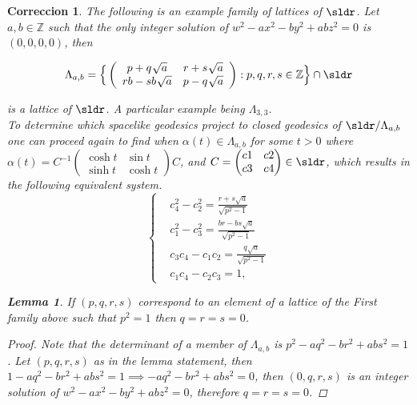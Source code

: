 \documentclass[11pt]{amsart}
\newtheorem{correccion}{Correccion}
\theoremstyle{plain}
\newtheorem{lem}[thm]{Lemma}
\theoremstyle{definition}
\theoremstyle{remark}
\begin{document}
\begin{correccion}
The following is an example family of lattices of $\sldr$. Let $a,b \in \mathbb{Z}$ such that the only integer solution of $w^2-ax^2-by^2+abz^2=0$ is $(0,0,0,0)$, then

\[ \Lambda_{a,b}= \Big\{ \left( \begin{array}{ccc}
p+q \,\, \sqrt[]{a} & r+s \,\, \sqrt[]{a} \\
rb-sb \,\, \sqrt[]{a} & p-q \,\, \sqrt[]{a} \end{array} \right):p,q,r,s \in \mathbb{Z} \Big\}  \cap \sldr \] 

is a lattice of $\sldr$. A particular example being $\Lambda_{3,3}$. \\

To determine which spacelike geodesics project to closed geodesics of $\sldr / \Lambda_{a,b}$ one can proceed again to find when $\alpha(t) \in \Lambda_{a,b}$ for some $t>0$ where
$\alpha(t) = C^{-1} \left( \begin{matrix}
\cosh{t} & \sin{t} \\
\sinh{t} & \cosh{t}
\end{matrix} \right) C$, and $C=\left( \begin{matrix} c1 & c2 \\ c3 & c4 \end{matrix} \right) \in \sldr$, which results in the following equivalent system. \\


\begin{equation}\label{example-equations}
    \begin{cases}
        & c_4^2-c_2^2=\frac{r+s\sqrt{a}}{\sqrt{p^2-1}}\\
        & c_1^2-c_3^2=\frac{br-bs\sqrt{a}}{\sqrt{p^2-1}}\\
        & c_3 c_4 - c_1 c_2 = \frac{q\sqrt{a}}{\sqrt{p^2-1}}\\
        & c_1 c_4 - c_2 c_3 = 1,    
    \end{cases}
\end{equation}





\begin{lem}\label{pcuadrado}
If $(p,q,r,s)$ correspond to an element of a lattice of the First family above such that $p^2=1$ then $q=r=s=0$.
\end{lem}



\begin{proof}
Note that the determinant of a member of $\Lambda_{a,b}$ is $p^2-aq^2-br^2+abs^2=1$. Let $(p,q,r,s)$ as in the lemma statement, then $1-aq^2-br^2+abs^2=1 \implies -aq^2-br^2+abs^2=0$, then  $(0,q,r,s)$ is an integer solution of $w^2-ax^2-by^2+abz^2=0$, therefore $q=r=s=0$.
\end{proof}



\end{correccion}
\end{document}

